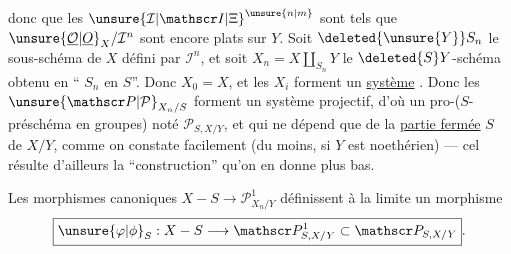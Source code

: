 donc     que les $\unsure{\mathcal I|\mathscr I|\Xi}^{\unsure{n|m}}$ sont tels que $\unsure{\underline{\mathcal O}|\underline O}_X/\mathcal I^n$ sont encore plats sur $Y$. Soit $\deleted{\unsure{Y}}S_n$ le sous-schéma de $X$ défini par $\mathcal I^n$, et soit $X_n=X\amalg_{S_n}Y$ le $\deleted{S}Y$-schéma obtenu en `` $S_n$ en $S$''.
  Donc $X_0=X$, et les $X_i$ forment un \uline{système} \uline{}.
Donc les $\unsure{\mathscr P|\mathcal P}_{X_n/S}$ forment un système  projectif, d’où un pro-($S$-préschéma en groupes) noté $\mathscr P_{S,X/Y}$, et qui ne dépend que de la \uline{partie fermée} $S$ de $X/Y$, comme on constate facilement (du moins, si $Y$ est noethérien) --- cel résulte d’ailleurs  la ``construction'' qu’on en donne plus bas.

Les morphismes canoniques $X-S\longrightarrow\mathscr P^1_{X_n/Y}$ définissent à la limite un morphisme
\[
\boxed{\unsure{\varphi|\phi}_S:X-S\longrightarrow\mathscr P^1_{S,X/Y}\subset\mathscr P_{S,X/Y}}.
\]
